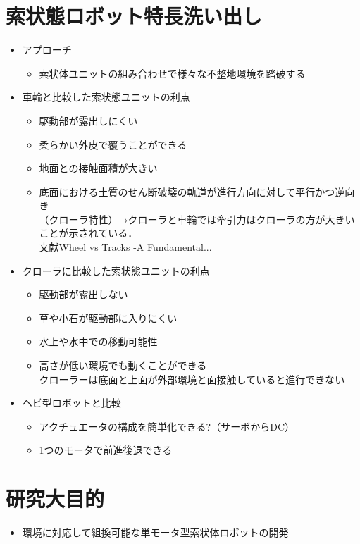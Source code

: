 \section*{索状態ロボット特長洗い出し}	
	\begin{itemize}
	\item{アプローチ}
		\begin{itemize}
			\item {索状体ユニットの組み合わせで様々な不整地環境を踏破する}
		\end{itemize}
	\item {車輪と比較した索状態ユニットの利点}
	\begin{itemize}
		\item {駆動部が露出しにくい}
		\item {柔らかい外皮で覆うことができる}
		\item {地面との接触面積が大きい}
		\item {底面における土質のせん断破壊の軌道が進行方向に対して平行かつ逆向き\\
		（クローラ特性）→クローラと車輪では牽引力はクローラの方が大きいことが示されている．\\
		\lbrack 文献\rbrack Wheel vs Tracks -A Fundamental...}
	\end{itemize}
	\item{クローラに比較した索状態ユニットの利点}
	\begin{itemize}
		\item {駆動部が露出しない}
		\item {草や小石が駆動部に入りにくい}
		\item {水上や水中での移動可能性}
		\item {高さが低い環境でも動くことができる\\
		クローラーは底面と上面が外部環境と面接触していると進行できない}
	\end{itemize}
	\item{ヘビ型ロボットと比較}
	\begin{itemize}
		\item {アクチュエータの構成を簡単化できる?（サーボからDC）}
		\item {1つのモータで前進後退できる}
	\end{itemize}
	\end{itemize}
\newpage

\section*{研究大目的}
	\begin{itemize}
	\item {環境に対応して組換可能な単モータ型索状体ロボットの開発}
	\end{itemize}
	
